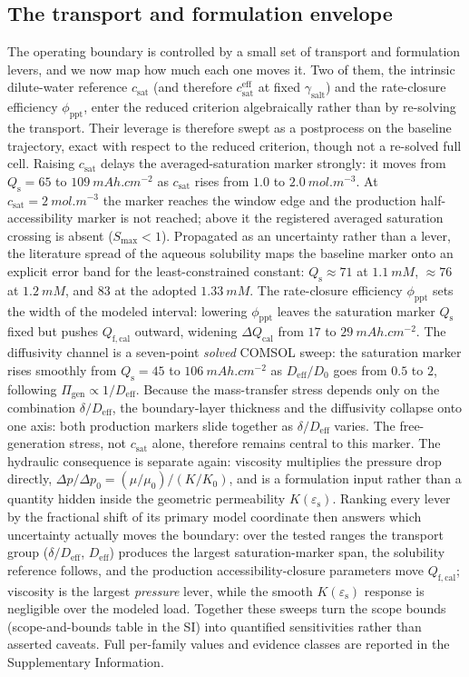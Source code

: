 \documentclass[11pt]{article}
\newcommand{\csat}{c_{\mathrm{sat}}}
\newcommand{\epss}{\varepsilon_{\mathrm{s}}}
\newcommand{\Deff}{D_{\mathrm{eff}}}
\newcommand{\Qfcal}{Q_{\mathrm{f,cal}}}
\newcommand{\mAhcm}{\si{mAh.cm^{-2}}}
\begin{document}
\subsection{The transport and formulation envelope}
\label{sec:res-sens}
The operating boundary is controlled by a small set of transport and formulation levers, and we now map how
much each one moves it. Two of them, the intrinsic dilute-water reference $\csat$ (and therefore
$\csat^{\mathrm{eff}}$ at fixed $\gamma_{\mathrm{salt}}$) and the rate-closure efficiency
$\phi_{\mathrm{ppt}}$, enter the reduced criterion algebraically rather than by re-solving the transport.
Their leverage is therefore swept as a postprocess on the baseline trajectory, exact with respect to the
reduced criterion, though not a re-solved full cell. Raising $\csat$ delays the averaged-saturation marker
strongly: it moves from $Q_{\mathrm s}=65$ to $\SI{109}{\mAhcm}$ as $\csat$ rises from $1.0$ to
$2.0~\si{mol.m^{-3}}$. At $\csat=\SI{2}{mol.m^{-3}}$ the marker reaches the window edge and the production
half-accessibility marker is not reached; above it the registered averaged saturation crossing is absent
($S_{\max}<1$). Propagated as an uncertainty rather than a lever, the literature spread
of the aqueous solubility maps the baseline marker onto an explicit error band for the least-constrained
constant: $Q_{\mathrm s}\approx71$ at $\SI{1.1}{mM}$, $\approx76$ at $\SI{1.2}{mM}$, and $83$ at the adopted
$\SI{1.33}{mM}$. The rate-closure efficiency $\phi_{\mathrm{ppt}}$ sets the width of the
modeled interval: lowering $\phi_{\mathrm{ppt}}$ leaves the saturation marker $Q_{\mathrm s}$ fixed
but pushes $\Qfcal$ outward, widening $\Delta Q_{\mathrm{cal}}$ from $17$ to
$\SI{29}{\mAhcm}$. The diffusivity channel is a seven-point \emph{solved}
COMSOL sweep: the saturation marker rises smoothly from $Q_{\mathrm s}=45$ to
$\SI{106}{\mAhcm}$ as $\Deff/D_0$ goes from $0.5$ to $2$, following $\Pi_{\mathrm{gen}}\propto1/\Deff$.
Because the mass-transfer stress depends only on the combination $\delta/\Deff$, the boundary-layer
thickness and the diffusivity collapse onto one axis: both production markers slide together as $\delta/\Deff$
varies. The free- generation stress, not $\csat$ alone, therefore remains
central to this marker. The hydraulic consequence is separate again: viscosity multiplies the pressure drop
directly, $\Delta p/\Delta p_0=(\mu/\mu_0)/(K/K_0)$, and is a formulation input rather than a quantity hidden
inside the geometric permeability $K(\epss)$. Ranking every lever by the fractional shift of its primary
model coordinate then answers which uncertainty actually
moves the boundary: over the tested ranges the transport group ($\delta/\Deff$, $\Deff$) produces the largest
saturation-marker span, the solubility reference follows, and the production accessibility-closure parameters
move $\Qfcal$;
viscosity is the largest \emph{pressure} lever, while the smooth $K(\epss)$ response is negligible over the
modeled load. Together these sweeps turn the scope bounds (scope-and-bounds table in the SI)
into quantified sensitivities rather than asserted caveats. Full per-family values and evidence classes are
reported in the Supplementary Information.
\end{document}
